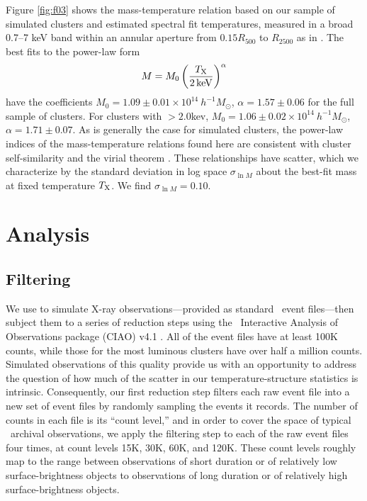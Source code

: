 \documentclass[12pt,preprint]{aastex}
\begin{document}
Figure \ref{fig:f03} shows the mass-temperature relation based on our
sample of simulated clusters and estimated spectral fit temperatures,
measured in a broad 0.7--7 keV band within an annular aperture from
$0.15 R_{500}$ to $R_{2500}$ as in \cite{cavagnolo_bandpass_2008}.
The best fits to the power-law form
\begin{equation}
  M = M_0 \left( \frac {T_{\rm X}} {2 \, {\rm keV}} \right)^\alpha
  \label{eq:mass-temp}
\end{equation}
have the coefficients $M_0 = 1.09\pm0.01 \times 10^{14}\ h^{-1}
M_{\odot}$, $\alpha = 1.57\pm0.06$ for the full sample of clusters.
For clusters with \thard$>2.0$kev, $M_0 = 1.06\pm0.02 \times 10^{14}\
h^{-1} M_{\odot}$, $\alpha = 1.71\pm0.07$.  As is generally the case
for simulated clusters, the power-law indices of the mass-temperature
relations found here are consistent with cluster self-similarity and
the virial theorem
\citep{kaiser_evolution_1986,navarro_simulations_1995}.  These
relationships have scatter, which we characterize by the standard
deviation in log space $\sigma_{\ln M}$ about the best-fit mass at
fixed temperature $T_{\rm X}$.  We find $\sigma_{\ln M} = 0.10$.

\section{Analysis}
\label{sec:analysis}

\subsection{Filtering}
\label{subsec:specextract}

We use  to simulate X-ray observations---provided as standard
\chandra\ event files---then subject them to a series of reduction
steps using the \chandra\ Interactive Analysis of Observations package
(CIAO) v4.1 \citep{fruscione_ciao:_2006}.  All of the event files have
at least 100K counts, while those for the most luminous clusters have
over half a million counts.  Simulated observations of this quality
provide us with an opportunity to address the question of how much of
the scatter in our temperature-structure statistics is intrinsic.
Consequently, our first reduction step filters each raw event file
into a new set of event files by randomly sampling the events it
records.  The number of counts in each file is its ``count level,''
and in order to cover the space of typical \chandra\ archival
observations, we apply the filtering step to each of the raw event
files four times, at count levels 15K, 30K, 60K, and 120K.  These
count levels roughly map to the range between observations of short
duration or of relatively low surface-brightness objects to
observations of long duration or of relatively high surface-brightness
objects.
\end{document}
